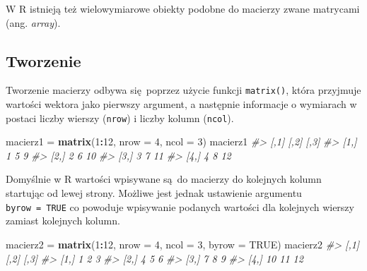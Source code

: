 \documentclass[paper=6in:9in,pagesize=pdftex,headinclude=on,footinclude=on,10pt]{scrbook}
\makeatletter
\newenvironment{Shaded}{\begin{snugshade}}{\end{snugshade}}
\newcommand{\CommentTok}[1]{\textcolor[rgb]{0.56,0.35,0.01}{\textit{#1}}}
\newcommand{\DataTypeTok}[1]{\textcolor[rgb]{0.13,0.29,0.53}{#1}}
\newcommand{\DecValTok}[1]{\textcolor[rgb]{0.00,0.00,0.81}{#1}}
\newcommand{\KeywordTok}[1]{\textcolor[rgb]{0.13,0.29,0.53}{\textbf{#1}}}
\newcommand{\NormalTok}[1]{#1}
\newcommand{\OperatorTok}[1]{\textcolor[rgb]{0.81,0.36,0.00}{\textbf{#1}}}
\newcommand{\OtherTok}[1]{\textcolor[rgb]{0.56,0.35,0.01}{#1}}
\newcommand{\StringTok}[1]{\textcolor[rgb]{0.31,0.60,0.02}{#1}}
\newenvironment{kframe}{%
\medskip{}
\setlength{\fboxsep}{.8em}
 \def\at@end@of@kframe{}%
 \ifinner\ifhmode%
  \def\at@end@of@kframe{\end{minipage}}%
  \begin{minipage}{\columnwidth}%
 \fi\fi%
 \def\FrameCommand##1{\hskip\@totalleftmargin \hskip-\fboxsep
 \colorbox{shadecolor}{##1}\hskip-\fboxsep
     \hskip-\linewidth \hskip-\@totalleftmargin \hskip\columnwidth}%
 \MakeFramed {\advance\hsize-\width
   \@totalleftmargin\z@ \linewidth\hsize
   \@setminipage}}%
 {\par\unskip\endMakeFramed%
 \at@end@of@kframe}
\newenvironment{rmdblock}[1]
  {
  \begin{itemize}
  \renewcommand{\labelitemi}{
    \raisebox{-.7\height}[0pt][0pt]{
      {\setkeys{Gin}{width=3em,keepaspectratio}\texttt{[image: images/\#1]}}
    }
  }
  \setlength{\fboxsep}{1em}
  \begin{kframe}
  \item
  }
  {
  \end{kframe}
  \end{itemize}
  }
\newenvironment{rmdinfo}
  {\begin{rmdblock}{compass}}
  {\end{rmdblock}}
\makeatother
\begin{document}
\begin{rmdinfo}
\begin{rmdinfo}

W R istnieją też wielowymiarowe obiekty podobne do macierzy zwane matrycami (ang. \emph{array}).

\end{rmdinfo}
\end{rmdinfo}

\hypertarget{tworzenie}{%
\subsection{Tworzenie}\label{tworzenie}}

Tworzenie macierzy odbywa się~poprzez użycie funkcji \texttt{matrix()}, która przyjmuje wartości wektora jako pierwszy argument, a następnie informacje o wymiarach w postaci liczby wierszy (\texttt{nrow}) i liczby kolumn (\texttt{ncol}).

\begin{Shaded}
\begin{Highlighting}[]
\NormalTok{macierz1 =}\StringTok{ }\KeywordTok{matrix}\NormalTok{(}\DecValTok{1}\OperatorTok{:}\DecValTok{12}\NormalTok{, }\DataTypeTok{nrow =} \DecValTok{4}\NormalTok{, }\DataTypeTok{ncol =} \DecValTok{3}\NormalTok{)}
\NormalTok{macierz1}
\CommentTok{#>      [,1] [,2] [,3]}
\CommentTok{#> [1,]    1    5    9}
\CommentTok{#> [2,]    2    6   10}
\CommentTok{#> [3,]    3    7   11}
\CommentTok{#> [4,]    4    8   12}
\end{Highlighting}
\end{Shaded}

Domyślnie w R wartości wpisywane są~do macierzy do kolejnych kolumn startując od lewej strony.
Możliwe jest jednak ustawienie argumentu \texttt{byrow\ =\ TRUE} co powoduje wpisywanie podanych wartości dla kolejnych wierszy zamiast kolejnych kolumn.

\begin{Shaded}
\begin{Highlighting}[]
\NormalTok{macierz2 =}\StringTok{ }\KeywordTok{matrix}\NormalTok{(}\DecValTok{1}\OperatorTok{:}\DecValTok{12}\NormalTok{, }\DataTypeTok{nrow =} \DecValTok{4}\NormalTok{, }\DataTypeTok{ncol =} \DecValTok{3}\NormalTok{, }\DataTypeTok{byrow =} \OtherTok{TRUE}\NormalTok{)}
\NormalTok{macierz2}
\CommentTok{#>      [,1] [,2] [,3]}
\CommentTok{#> [1,]    1    2    3}
\CommentTok{#> [2,]    4    5    6}
\CommentTok{#> [3,]    7    8    9}
\CommentTok{#> [4,]   10   11   12}
\end{Highlighting}
\end{Shaded}
\end{document}
